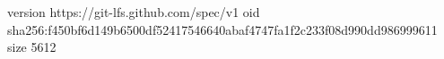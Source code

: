 version https://git-lfs.github.com/spec/v1
oid sha256:f450bf6d149b6500df52417546640abaf4747fa1f2c233f08d990dd986999611
size 5612
